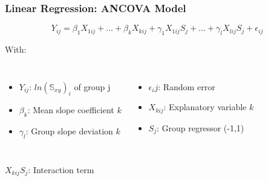 \documentclass[xcolor=table]{beamer}
\begin{document}

\begin{frame}
	\frametitle{Linear Regression: ANCOVA Model}
	
	\begin{equation}
		Y_{ij} = \beta_1 X_{1ij} + ... + \beta_k X_{kij} + \gamma_1 X_{1ij} S_j + ... + \gamma_l X_{lij} S_j + \epsilon_{ij}
	\end{equation}
	
	With:
	
	\begin{columns}[c]
		\begin{itemize}
			\item $Y_{ij}$: $ln(\mathbb{S}_{xy})_i$ of group j
			\item $\beta_k$: Mean slope coefficient $k$
			\item $\gamma_l$: Group slope deviation $k$
		\end{itemize}
		\begin{itemize}
			\item $\epsilon_{i}j$: Random error
			\item $X_{kij}$: Explanatory variable $k$
			\item $S_{j}$: Group regressor (-1,1)
		\end{itemize}
	\end{columns}

	\centering\vspace{1em}
	$X_{kij} S_j$: Interaction term
	
\end{frame}

\end{document}
